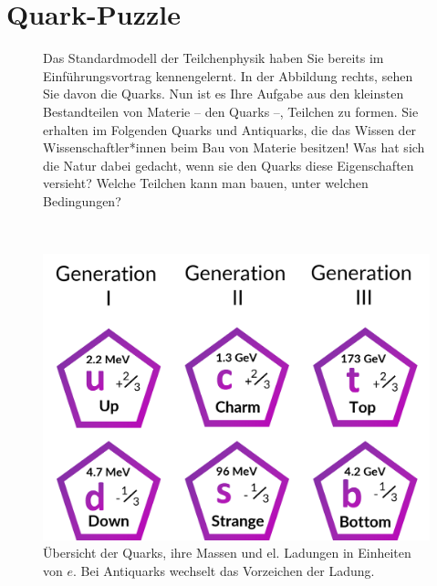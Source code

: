 



\small
\section*{\huge{Quark-Puzzle}}
\begin{figure}[h]
    \begin{minipage}[t]{0.474\textwidth}
        Das Standardmodell der Teilchenphysik haben Sie bereits im Einführungsvortrag kennengelernt. In der Abbildung rechts, sehen Sie davon die Quarks.  Nun ist es Ihre Aufgabe aus den kleinsten Bestandteilen von Materie -- den Quarks --, Teilchen zu formen. Sie erhalten im Folgenden Quarks und Antiquarks, die das Wissen der Wissenschaftler*innen beim Bau von Materie besitzen! Was hat sich die Natur dabei gedacht, wenn sie den Quarks diese Eigenschaften versieht? Welche Teilchen kann man bauen, unter welchen Bedingungen? 
    \end{minipage}~~
     \begin{minipage}[t]{0.50\textwidth}
     \centering
       \vspace{-1cm}\includegraphics[width=.8\textwidth]{Figures Worksheets/Quarks_Quark_Puzzle_Worksheet.png}
         \caption{Übersicht der Quarks, ihre Massen und el. Ladungen in Einheiten von $e$. Bei Antiquarks wechselt das Vorzeichen der Ladung.}
    \end{minipage}
    \end{figure}
